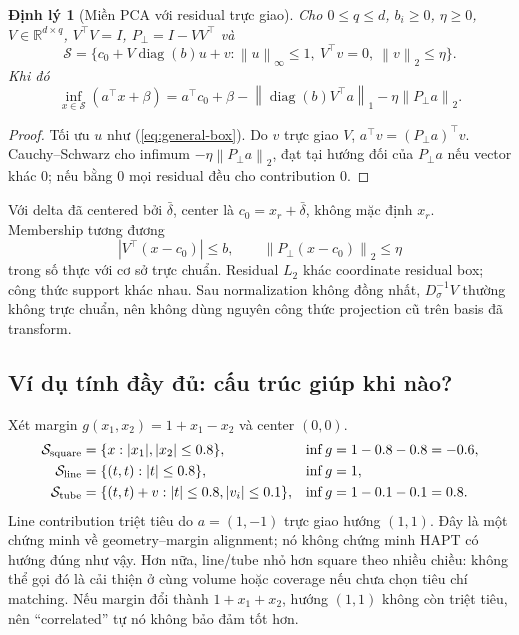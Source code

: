 \documentclass[11pt,a4paper]{article}
\newcommand{\R}{\mathbb R}
\newcommand{\norm}[1]{\left\lVert #1\right\rVert}
\newcommand{\diag}{\operatorname{diag}}
\newcommand{\Sset}{\mathcal S}
\newtheorem{theorem}[definition]{Định lý}
\theoremstyle{remark}
\begin{document}
\begin{theorem}[Miền PCA với residual trực giao]\label{th:pca}
Cho $0\le q\le d$, $b_i\ge0$, $\eta\ge0$,
$V\in\R^{d\times q}$, $V^\top V=I$, $P_\perp=I-VV^\top$ và
\begin{equation}
 \Sset=\{c_0+V\diag(b)u+v:
 \norm{u}_\infty\le1,\ V^\top v=0,\ \norm{v}_2\le\eta\}.
\end{equation}
Khi đó
\begin{equation}
 \inf_{x\in\Sset}(a^\top x+\beta)=a^\top c_0+\beta
 -\norm{\diag(b)V^\top a}_1-\eta\norm{P_\perp a}_2.
\end{equation}
\end{theorem}
\begin{proof}
Tối ưu $u$ như (\ref{eq:general-box}). Do $v$ trực giao $V$,
$a^\top v=(P_\perp a)^\top v$. Cauchy--Schwarz cho infimum
$-\eta\norm{P_\perp a}_2$, đạt tại hướng đối của $P_\perp a$ nếu vector
khác 0; nếu bằng 0 mọi residual đều cho contribution 0.
\end{proof}
Với delta đã centered bởi $\bar\delta$, center là $c_0=x_r+\bar\delta$,
không mặc định $x_r$. Membership tương đương
\begin{equation}
 |V^\top(x-c_0)|\le b,\qquad
 \norm{P_\perp(x-c_0)}_2\le\eta
\end{equation}
trong số thực với cơ sở trực chuẩn. Residual $L_2$ khác coordinate residual
box; công thức support khác nhau. Sau normalization không đồng nhất,
$D_\sigma^{-1}V$ thường không trực chuẩn, nên không dùng nguyên công thức
projection cũ trên basis đã transform.

\subsection{Ví dụ tính đầy đủ: cấu trúc giúp khi nào?}
Xét margin $g(x_1,x_2)=1+x_1-x_2$ và center $(0,0)$.
\begin{align}
\Sset_{\rm square}&=\{x:|x_1|,|x_2|\le0.8\},
 &\inf g&=1-0.8-0.8=-0.6,\\
\Sset_{\rm line}&=\{(t,t):|t|\le0.8\},
 &\inf g&=1,\\
\Sset_{\rm tube}&=\{(t,t)+v:|t|\le0.8,|v_i|\le0.1\},
 &\inf g&=1-0.1-0.1=0.8.
\end{align}
Line contribution triệt tiêu do $a=(1,-1)$ trực giao hướng $(1,1)$.
Đây là một chứng minh về geometry--margin alignment; nó không chứng minh
HAPT có hướng đúng như vậy. Hơn nữa, line/tube nhỏ hơn square theo nhiều
chiều: không thể gọi đó là cải thiện ở cùng volume hoặc coverage nếu chưa
chọn tiêu chí matching. Nếu margin đổi thành $1+x_1+x_2$, hướng $(1,1)$
không còn triệt tiêu, nên ``correlated'' tự nó không bảo đảm tốt hơn.
\end{document}
